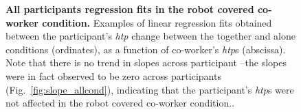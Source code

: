 \begin{figure}
	\caption{{\bf All participants regression fits in the robot covered co-worker condition.} Examples of linear regression fits obtained between the participant's {\it htp} change between the together and alone conditions (ordinates), as a function of co-worker's {\it htp}s (abscissa). Note that there is no trend in slopes across participant  --the slopes were in fact observed to be zero across participants (Fig.~\ref{fig:slope_allcond}), indicating that  the participant's {\it htp}s were not affected in the robot covered co-worker condition..}
\label{S3_Fig}
\end{figure}



